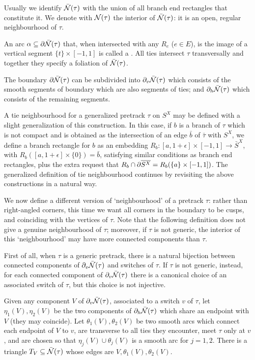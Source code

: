 \begin{defin}
Usually we identify $\bar{{\mathcal N}}(\tau)$ with the union of all branch end rectangles that constitute it. We denote with ${\mathcal N}(\tau)$ the interior of $\bar{{\mathcal N}}(\tau)$: it is an open, regular neighbourhood of $\tau$.

An arc $\alpha \subseteq \partial\bar{{\mathcal N}}(\tau)$ that, when intersected with any $R_e$ ($e\in E$), is the image of a vertical segment $\{t\}\times[-1,1]$ is called a . All ties intersect $\tau$ transversally and together they specify a foliation of $\bar{{\mathcal N}}(\tau)$.

The boundary $\partial\bar{{\mathcal N}}(\tau)$ can be subdivided into $\partial_v\bar{{\mathcal N}}(\tau)$ which consists of the smooth segments of boundary which are also segments of ties; and $\partial_h\bar{{\mathcal N}}(\tau)$ which consists of the remaining segments.
\end{defin}

A tie neighbourhood for a generalized pretrack $\tau$ on $S^X$ may be defined with a slight generalization of this construction. In this case, if $b$ is a branch of $\tau$ which is not compact and is obtained as the intersection of an edge $\bar b$ of $\bar\tau$ with $S^X$, we define a branch rectangle for $b$ as an embedding $R_b:[a,1+\epsilon]\times[-1,1]\rightarrow \bar S^X$, with $R_b([a,1+\epsilon]\times\{0\})=\bar b$, satisfying similar conditions as branch end rectangles, plus the extra request that $R_b\cap \partial\overline{S^X}=R_b(\{a\}\times[-1,1])$. The generalized definition of tie neighbourhood continues by revisiting the above constructions in a natural way.

We now define a different version of `neighbourhood' of a pretrack $\tau$: rather than right-angled corners, this time we want all corners in the boundary to be cusps, and coinciding with the vertices of $\tau$. Note that the following definition does not give a genuine neighbourhood of $\tau$; moreover, if $\tau$ is not generic, the interior of this `neighbourhood' may have more connected components than $\tau$.

First of all, when $\tau$ is a generic pretrack, there is a natural bijection between connected components of $\partial_v\bar{{\mathcal N}}(\tau)$ and switches of $\tau$. If $\tau$ is not generic, instead, for each connected component of $\partial_v\bar{{\mathcal N}}(\tau)$ there is a canonical choice of an associated switch of $\tau$, but this choice is not injective.

Given any component $V$ of $\partial_v\bar{{\mathcal N}}(\tau)$, associated to a switch $v$ of $\tau$, let $\eta_1(V),\eta_2(V)$ be the two components of $\partial_h\bar{{\mathcal N}}(\tau)$ which share an endpoint with $V$ (they may coincide). Let $\theta_1(V),\theta_2(V)$ be two smooth arcs which connect each endpoint of $V$ to $v$, are transverse to all ties they encounter, meet $\tau$ only at $v$, and are chosen so that $\eta_j(V)\cup\theta_j(V)$ is a smooth arc for $j=1,2$. There is a triangle $T_V\subseteq\bar{{\mathcal N}}(\tau)$ whose edges are $V,\theta_1(V),\theta_2(V)$. 

